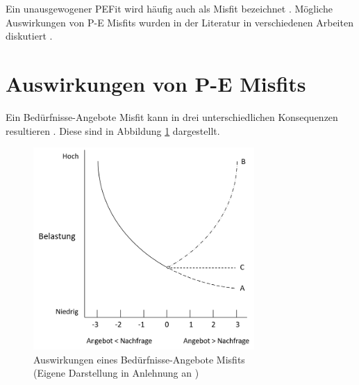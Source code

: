 Ein unausgewogener \ac{PEFit} wird häufig auch als Misfit bezeichnet \cite[S. 2]{edwards:2004}\cite[S. 28]{mechanismsOfJobStressAndStrain:1982}\cite[S. 4]{kristof:1996}. Mögliche Auswirkungen von P-E Misfits wurden in der Literatur in verschiedenen Arbeiten diskutiert \cite[S. 5f.]{caplan:1987}\cite[S. 21ff.]{edwards:2008}\cite[S. 28ff.]{mechanismsOfJobStressAndStrain:1982}\cite[S. 4ff.]{copingAndAdaption:1974}\cite[S. 9ff.]{harrison:1978}.

\section{Auswirkungen von P-E Misfits}
\label{ch:personEnvironmentFit:auswirkungenErhoehterAngebote}
Ein Bedürfnisse-Angebote Misfit kann in drei unterschiedlichen Konsequenzen resultieren \cite[S. 21ff.]{edwards:2008}\cite[S. 28ff.]{mechanismsOfJobStressAndStrain:1982}\cite[S. 9ff.]{harrison:1978}. Diese sind in Abbildung \ref{fig:personEnvironmentFit:auswirkungenErhoehterAngebote:abb1} dargestellt.

\begin{figure}[h]
	\centering
	\includegraphics[width=0.75\textwidth]{gfx/ueberschuss_supply_motive.png}
	\caption[Auswirkungen eines Bedürfnisse-Angebote Misfits]{Auswirkungen eines Bedürfnisse-Angebote Misfits\\(Eigene Darstellung in Anlehnung an \cite[S. 23]{edwards:2008})}
	\label{fig:personEnvironmentFit:auswirkungenErhoehterAngebote:abb1}
\end{figure}


